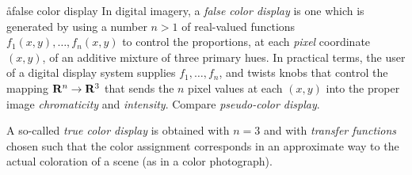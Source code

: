 \aa{false color display}
In digital imagery, a {\it false color display} is one which is generated by
using a number $n>1$ of real-valued functions
$f_1(x,y),\dots,f_n(x,y)$ to control the
proportions, at each {\it pixel} coordinate $(x,y)$,
of an additive mixture of three primary hues.
In practical terms, the user of a digital display system supplies
$f_1,\dots,f_n$, and twists knobs that control the mapping
$\bold R^n\to\bold R^3$ that sends the $n$ pixel values
at each $(x,y)$ into the proper image {\it chromaticity} and {\it intensity}.
Compare {\it pseudo-color display}.
\par
A so-called {\it true color display} is obtained with $n=3$
and with {\it transfer functions} chosen such that the color assignment
corresponds in an approximate way to the actual coloration of a scene
(as in a color photograph).


